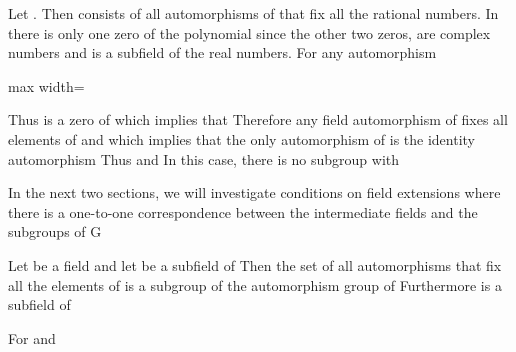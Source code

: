 \documentclass[11pt,oneside]{article}
\begin{document}
\begin{BookBody}
 Let . Then  consists of all automorphisms of  that fix all the rational numbers. In  there is only one zero of the polynomial  since the other two zeros,  are complex numbers and  is a subfield of the real numbers. For any automorphism 

\begin{center}\begin{adjustbox}{max width=\linewidth}\end{adjustbox}\end{center}

Thus  is a zero of  which implies that  Therefore any field automorphism of  fixes all elements of  and  which implies that the only automorphism of  is the identity automorphism  Thus  and  In this case, there is no subgroup  with \BookEnd{\blacktriangle}

In the next two sections, we will investigate conditions on field extensions  where there is a one-to-one correspondence between the intermediate fields and the subgroups of G

 Let  be a field and let  be a subfield of  Then the set  of all automorphisms that fix all the elements of  is a subgroup of the automorphism group of  Furthermore is a subfield of 

 For  and 


\end{BookBody}
\end{document}
